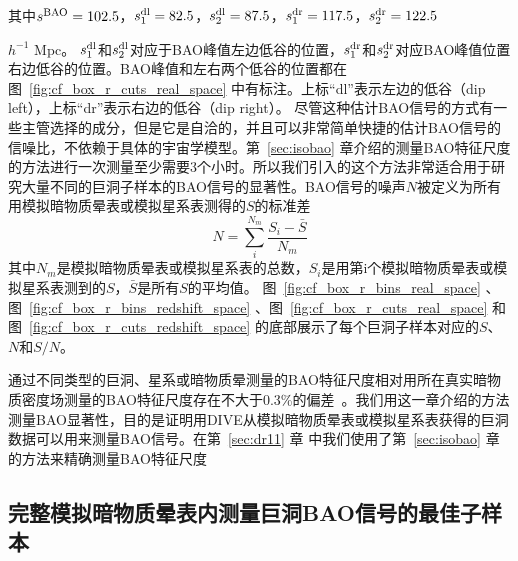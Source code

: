 其中$s^{\rm BAO}=102.5$，$s_{\rm 1}^{\rm dl}=82.5$，$s_{\rm 2}^{\rm dl}=87.5$，$s_{\rm 1}^{\rm dr}=117.5$，$s_{\rm 2}^{\rm dr}=122.5$  { { $h^{-1}$ Mpc}。
$s_{\rm 1}^{\rm dl}$和$s_{\rm 2}^{\rm dl}$对应于BAO峰值左边低谷的位置，$s_{\rm 1}^{\rm dr}$和$s_{\rm 2}^{\rm dr}$对应BAO峰值位置右边低谷的位置。BAO峰值和左右两个低谷的位置都在图~\ref{fig:cf_box_r_cuts_real_space} 中有标注。上标“dl”表示左边的低谷（dip left），上标“dr”表示右边的低谷（dip right）。
尽管这种估计BAO信号的方式有一些主管选择的成分，但是它是自洽的，并且可以非常简单快捷的估计BAO信号的信噪比，不依赖于具体的宇宙学模型。第~\ref{sec:isobao} 章介绍的测量BAO特征尺度的方法进行一次测量至少需要3个小时。所以我们引入的这个方法非常适合用于研究大量不同的巨洞子样本的BAO信号的显著性。BAO信号的噪声$N$被定义为所有用模拟暗物质晕表或模拟星系表测得的$S$的标准差
\begin{equation}
N = \sum^{N_m}_{i}\frac{S_i - \bar{S} } {N_m}
\end{equation}
其中$N_m$是模拟暗物质晕表或模拟星系表的总数，$S_i$是用第i个模拟暗物质晕表或模拟星系表测到的$S$，$\bar{S}$是所有$S$的平均值。
图~\ref{fig:cf_box_r_bins_real_space} 、图~\ref{fig:cf_box_r_bins_redshift_space} 、图~\ref{fig:cf_box_r_cuts_real_space} 和图~\ref{fig:cf_box_r_cuts_redshift_space} 的底部展示了每个巨洞子样本对应的$S$、$N$和$S/N$。

通过不同类型的巨洞、星系或暗物质晕测量的BAO特征尺度相对用所在真实暗物质密度场测量的BAO特征尺度存在不大于0.3\%的偏差~\cite{2014MNRAS.442.2131A,2014arXiv1410.4684P}。我们用这一章介绍的方法测量BAO显著性，目的是证明用DIVE从模拟暗物质晕表或模拟星系表获得的巨洞数据可以用来测量BAO信号。在第~\ref{sec:dr11} 章
中我们使用了第~\ref{sec:isobao} 章的方法来精确测量BAO特征尺度

\subsection{完整模拟暗物质晕表内测量巨洞BAO信号的最佳子样本}
\label{sec:completeoptr}

}
